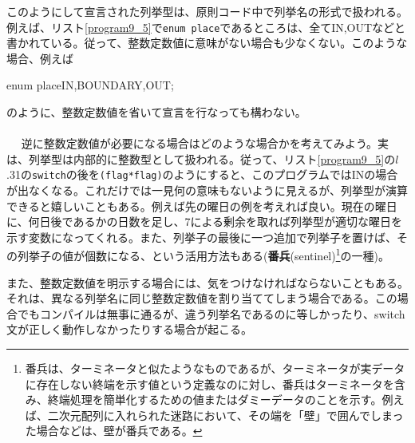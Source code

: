 このようにして宣言された列挙型は、原則コード中で列挙名の形式で扱われる。例えば、リスト\ref{program9_5}で\verb|enum place|であるところは、全てIN,OUTなどと書かれている。従って、整数定数値に意味がない場合も少なくない。このような場合、例えば
\begin{code}
enum place{IN,BOUNDARY,OUT};
\end{code}
のように、整数定数値を省いて宣言を行なっても構わない。
\\ \\　
逆に整数定数値が必要になる場合はどのような場合かを考えてみよう。実は、列挙型は内部的に整数型として扱われる。従って、リスト\ref{program9_5}の$l$.31の\verb|switch|の後を\verb|(flag*flag)|のようにすると、このプログラムではINの場合が出なくなる。これだけでは一見何の意味もないように見えるが、列挙型が演算できると嬉しいこともある。例えば先の曜日の例を考えれば良い。現在の曜日に、何日後であるかの日数を足し、7による剰余を取れば列挙型が適切な曜日を示す変数になってくれる。また、列挙子の最後に一つ追加で列挙子を置けば、その列挙子の値が個数になる、という活用方法もある(\textbf{番兵}(sentinel)\footnote{番兵は、ターミネータと似たようなものであるが、ターミネータが実データに存在しない終端を示す値という定義なのに対し、番兵はターミネータを含み、終端処理を簡単化するための値またはダミーデータのことを示す。例えば、二次元配列に入れられた迷路において、その端を「壁」で囲んでしまった場合などは、壁が番兵である。}の一種)。

また、整数定数値を明示する場合には、気をつけなければならないこともある。それは、異なる列挙名に同じ整数定数値を割り当ててしまう場合である。この場合でもコンパイルは無事に通るが、違う列挙名であるのに等しかったり、switch文が正しく動作しなかったりする場合が起こる。

